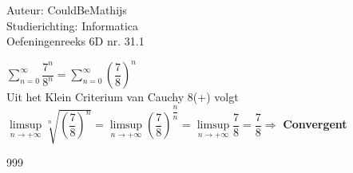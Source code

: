 \documentclass[a4paper]{article}
\begin{document}
  
\noindent \large Auteur: CouldBeMathijs \\
\noindent \large Studierichting: Informatica\\
\noindent \large Oefeningenreeks 6D nr. 31.1\\

\medskip

\normalsize

$\displaystyle\sum_{n=0}^\infty \dfrac{7^n}{8^n} = \sum_{n=0}^\infty \left(\dfrac{7}{8}\right)^n$\\

Uit het Klein Criterium van Cauchy 8(+) volgt\\

$\limsup\limits_{n\rightarrow +\infty} \sqrt[n]{\left(\dfrac{7}{8}\right)^n} = \limsup\limits_{n\rightarrow +\infty} \left(\dfrac{7}{8
}\right)^{\dfrac{n}{n}} = \limsup\limits_{n\rightarrow +\infty} \dfrac{7}{8} = \dfrac{7}{8}\Rightarrow$ \textbf{Convergent}


\begin{thebibliography}{999}
\end{thebibliography}
\end{document}
